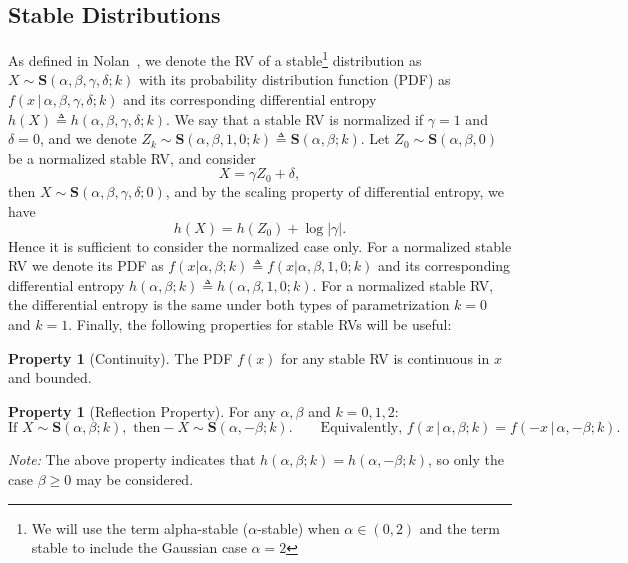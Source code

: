 \documentclass{article}
\theoremstyle{definition}
\newtheorem{property}[definition]{Property}
\begin{document}
\subsection{Stable Distributions}
As defined in Nolan~\cite{NolanJohnP2020USDM}, we denote the RV of a stable\footnote{We will use the term alpha-stable (\(\alpha\)-stable) when \(\alpha \in (0,2)\) and the term stable to include the Gaussian case \(\alpha=2\)} distribution as \(X\!\sim\!\mathbf{S}(\alpha,\beta,\gamma,\delta;k)\) with its probability distribution function (PDF) as \(f(x\,|\,\alpha,\beta,\gamma,\delta;k)\) and its corresponding differential entropy \(h(X)\triangleq h(\alpha,\beta,\gamma,\delta;k)\).\(\!\) We say that a stable RV is normalized if \(\gamma=1\) and \(\delta=0\), and we denote \(Z_k\sim\mathbf{S}(\alpha,\beta,1,0;k)\triangleq\mathbf{S}(\alpha,\beta;k)\).  Let \(Z_0\sim\mathbf{S}(\alpha,\beta,0)\) be a normalized stable RV, and consider \begin{equation}
X=\gamma Z_0+\delta,  
\end{equation}
then
\(
X \sim\mathbf{S}(\alpha,\beta,\gamma,\delta;0)\), and by the scaling property of differential entropy, we have
\begin{equation}\label{pr:scaling_entropy}
h(X) = h(Z_0) + \log|\gamma|.  
\end{equation}
Hence it is sufficient to consider the normalized case only. \(\!\)For a normalized stable RV we denote its PDF as  \(f(x|\alpha,\beta;k)\triangleq f(x|\alpha,\beta,1,0;k)\) and its corresponding differential entropy \(h(\alpha,\beta;k) \triangleq h(\alpha,\beta,1,0;k)\). For a normalized stable RV, the differential entropy is the same under both types of parametrization \(k=0\) and \(k=1\). Finally, the following properties for stable RVs will be useful:
\begin{property}[Continuity]
    The PDF \(f(x)\) for any stable RV is continuous in \(x\) and bounded.
\end{property}
\begin{property}[{Reflection Property}]\label{reflection-property}
For any \(\alpha,\beta\) and \(k=0,1,2\):
\[
\text{If } X\sim\mathbf{S}(\alpha,\beta;k), \text{ then}-\!X\sim\mathbf{S}(\alpha,-\beta;k).\qquad
\text{Equivalently, } f(x\,|\,\alpha,\beta;k)=f(-x\,|\,\alpha,-\beta;k).
\]
\end{property}

\textit{Note:} The above property indicates that \(h(\alpha,\beta;k)=h(\alpha,-\beta;k)\), so only the case \(\beta\ge0\) may be considered.
\end{document}
